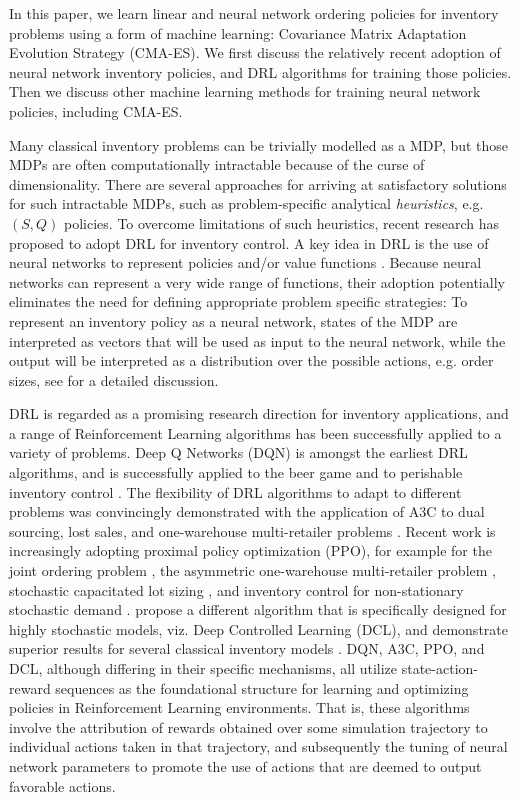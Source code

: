 \documentclass[authoryear,11pt]{elsarticle}
\begin{document}
In this paper, we learn linear and neural network ordering policies for inventory problems using a form of machine learning: Covariance Matrix Adaptation Evolution Strategy (CMA-ES). We first discuss the relatively recent adoption of neural network inventory policies, and DRL algorithms for training those policies. Then we discuss other machine learning methods for training neural network policies, including CMA-ES.

Many classical inventory problems can be trivially modelled as a MDP, but those MDPs are often computationally intractable because of the curse of dimensionality. There are several approaches for arriving at satisfactory solutions for such intractable MDPs, such as problem-specific analytical \emph{heuristics}, e.g. $(S,Q)$ policies. To overcome limitations of such heuristics, recent research has proposed to adopt DRL for inventory control. A key idea in DRL is the use of neural networks to represent policies and/or value functions \citep{boute2022deep}. Because neural networks can represent a very wide range of functions, their adoption potentially eliminates the need for defining appropriate problem specific strategies: To represent an inventory policy as a neural network, states of the MDP are interpreted as vectors that will be used as input to the neural network, while the output will be interpreted as a distribution over the possible actions, e.g. order sizes, see \cite{boute2022deep} for a detailed discussion.

DRL is regarded as a promising research direction for inventory applications, and a range of Reinforcement Learning algorithms has been successfully applied to a variety of problems. Deep Q Networks (DQN) is amongst the earliest DRL algorithms, and is successfully applied to the beer game \citep{oroojlooyjadid2022deep} and to perishable inventory control \citep{deMoor2022perishable}. The flexibility of DRL algorithms to adapt to different problems was convincingly demonstrated with the application of A3C to dual sourcing, lost sales, and one-warehouse multi-retailer problems \citep{gijsbrechts2022drl}. Recent work is increasingly adopting proximal policy optimization (PPO), for example for the joint ordering problem \citep{vanvuchelen2020jrp}, the asymmetric one-warehouse multi-retailer problem \citep{kaynov2024owmr}, stochastic capacitated lot sizing \citep{vanhezewijk2023using}, and inventory control for non-stationary stochastic demand \citep{dehaybe2024deep}. \cite{temizoz2025dcl} propose a different algorithm that is specifically designed for highly stochastic models, viz. Deep Controlled Learning (DCL), and demonstrate superior results for several classical inventory models \citep[see also][]{van2025scalable}. DQN, A3C, PPO, and DCL, although differing in their specific mechanisms, all utilize state-action-reward sequences as the foundational structure for learning and optimizing policies in Reinforcement Learning environments. That is, these algorithms involve the attribution of rewards obtained over some simulation trajectory to individual actions taken in that trajectory, and subsequently the tuning of neural network parameters to promote the use of actions that are deemed to output favorable actions.
\end{document}
